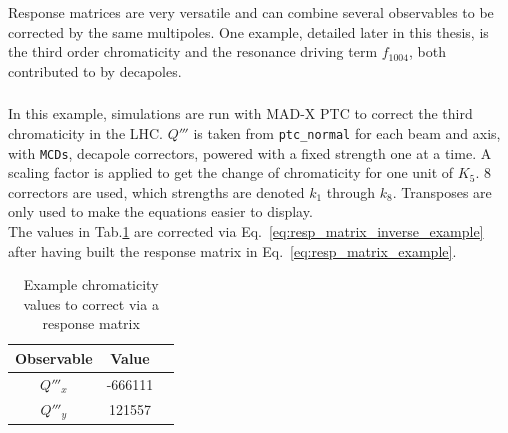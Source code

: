 Response matrices are very versatile and can combine several observables to be corrected by the same
multipoles. One example, detailed later in this thesis, is the third order chromaticity and the
resonance driving term $f_{1004}$, both contributed to by decapoles.

\subsubsection{}

In this example, simulations are run with MAD-X PTC to correct the third chromaticity in the LHC.
$Q'''$ is taken from \verb|ptc_normal| for each beam and axis, with \verb|MCDs|, decapole
correctors, powered with a fixed strength one at a time. A scaling factor is applied to get the
change of chromaticity for one unit of $K_5$.  8 correctors are used, which strengths are denoted
$k_1$ through $k_8$.  Transposes are only used to make the equations easier to display.\\
The values in Tab.\ref{table:resp_matrix_example} are corrected via
Eq.~\eqref{eq:resp_matrix_inverse_example} after having built the response matrix in
Eq.~\eqref{eq:resp_matrix_example}.

\begin{table}[H]
  \center
  \begin{tabular}{c c c}
      Observable & Value \\
      \hline
      $Q'''_x$ & -666111 \\
      $Q'''_y$ &  121557 \\
  \end{tabular}
  \caption{Example chromaticity values to correct via a response matrix}
  \label{table:resp_matrix_example}
\end{table}

